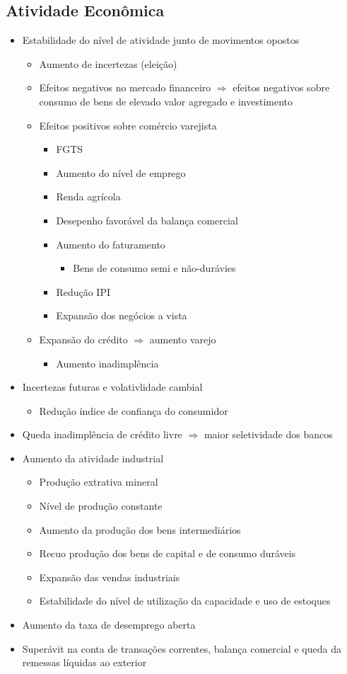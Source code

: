 \documentclass[11pt]{article}
\begin{document}
\subsection*{Atividade Econômica}
\label{sec:org67d2d7e}
\begin{itemize}
\item Estabilidade do nível de atividade junto de movimentos opostos
\begin{itemize}
\item Aumento de incertezas (eleição)
\item Efeitos negativos no mercado financeiro \(\Rightarrow\) efeitos negativos sobre consumo de bens de elevado valor agregado e investimento
\item Efeitos positivos sobre comércio varejista
\begin{itemize}
\item FGTS
\item Aumento do nível de emprego
\item Renda agrícola
\item Desepenho favorável da balança comercial
\item Aumento do faturamento
\begin{itemize}
\item Bens de consumo semi e não-durávies
\end{itemize}
\item Redução IPI
\item Expansão dos negócios a vista
\end{itemize}
\item Expansão do crédito \(\Rightarrow\) aumento varejo
\begin{itemize}
\item Aumento inadimplência
\end{itemize}
\end{itemize}
\item Incertezas futuras e volativlidade cambial
\begin{itemize}
\item Redução índice de confiança do consumidor
\end{itemize}
\item Queda inadimplência de crédito livre \(\Rightarrow\) maior seletividade dos bancos
\item Aumento da atividade industrial
\begin{itemize}
\item Produção extrativa mineral
\item Nível de produção constante
\item Aumento da produção dos bens intermediários
\item Recuo produção dos bens de capital e de consumo duráveis
\item Expansão das vendas industriais
\item Estabilidade do nível de utilização da capacidade e uso de estoques
\end{itemize}
\item Aumento da taxa de desemprego aberta
\item Superávit na conta de transações correntes, balança comercial e queda da remessas líquidas ao exterior
\end{itemize}
\end{document}
